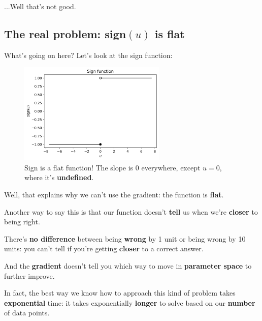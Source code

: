         ...Well that's not good.
        
    \subsection{The real problem: sign$(u)$ is flat}
    
        What's going on here? Let's look at the sign function:
        
        \begin{figure}[H]
            \centering
            
            \includegraphics[width=70mm,scale=0.5]{images/classification_images/sign_function.png}
            \caption*{Sign is a flat function! The slope is 0 everywhere, except $u=0$, where it's \textbf{undefined}.}
        \end{figure}
        
        Well, that explains why we can't use the gradient: the function is \textbf{flat}.
        
        Another way to say this is that our function doesn't \textbf{tell} us when we're \textbf{closer} to being right.
        
        There's \textbf{no difference} between being \textbf{wrong} by 1 unit or being wrong by 10 units: you can't tell if you're getting \textbf{closer} to a correct answer.
        
        And the \textbf{gradient} doesn't tell you which way to move in \textbf{parameter space} to further improve.
        
        In fact, the best way we know how to approach this kind of problem takes \textbf{exponential} time: it takes exponentially \textbf{longer} to solve based on our \textbf{number} of data points.
        
